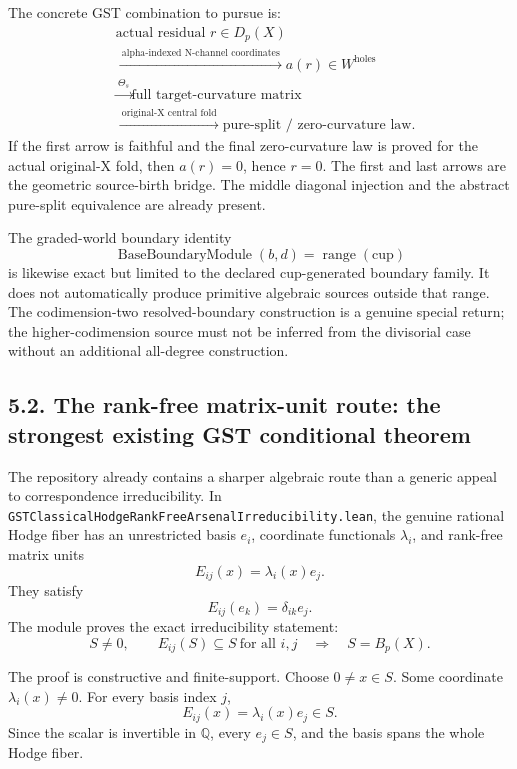 The concrete GST combination to pursue is:
\[
\begin{aligned}
&\text{actual residual }r\in D_p(X)
\\
&\xrightarrow{\ \text{alpha-indexed N-channel coordinates}\ }
a(r)\in W^{\mathrm{holes}}
\\
&\xrightarrow{\ \Theta_s\ }
\text{full target-curvature matrix}
\\
&\xrightarrow{\ \text{original-X central fold}\ }
\text{pure-split / zero-curvature law}.
\end{aligned}
\]
If the first arrow is faithful and the final zero-curvature law is proved for the actual original-X fold, then \(a(r)=0\), hence \(r=0\). The first and last arrows are the geometric source-birth bridge. The middle diagonal injection and the abstract pure-split equivalence are already present.

The graded-world boundary identity
\[
\operatorname{BaseBoundaryModule}(b,d)=\operatorname{range}(\mathrm{cup})
\]
is likewise exact but limited to the declared cup-generated boundary family. It does not automatically produce primitive algebraic sources outside that range. The codimension-two resolved-boundary construction is a genuine special return; the higher-codimension source must not be inferred from the divisorial case without an additional all-degree construction.

\subsection*{5.2. The rank-free matrix-unit route: the strongest existing GST conditional theorem}

The repository already contains a sharper algebraic route than a generic appeal to correspondence irreducibility. In \texttt{GSTClassicalHodgeRankFreeArsenalIrreducibility.lean}, the genuine rational Hodge fiber has an unrestricted basis \(e_i\), coordinate functionals \(\lambda_i\), and rank-free matrix units
\[
E_{ij}(x)=\lambda_i(x)e_j.
\]
They satisfy
\[
E_{ij}(e_k)=\delta_{ik}e_j.
\]
The module proves the exact irreducibility statement:
\[
S\ne0,\qquad E_{ij}(S)\subseteq S\ \text{for all }i,j
\quad\Longrightarrow\quad S=B_p(X).
\]

The proof is constructive and finite-support. Choose \(0\ne x\in S\). Some coordinate \(\lambda_i(x)\ne0\). For every basis index \(j\),
\[
E_{ij}(x)=\lambda_i(x)e_j\in S.
\]
Since the scalar is invertible in \(\mathbb Q\), every \(e_j\in S\), and the basis spans the whole Hodge fiber.

